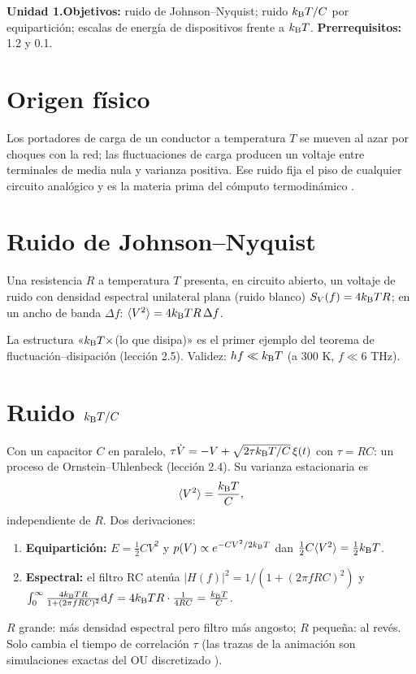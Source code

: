 \documentclass[11pt,a4paper]{article}
\begin{document}

\noindent\textbf{Unidad 1.}\quad\textbf{Objetivos:} ruido de Johnson--Nyquist; ruido $k_{\mathrm B} T/C$ por equipartición;
escalas de energía de dispositivos frente a $k_{\mathrm B} T$. \textbf{Prerrequisitos:} 1.2 y 0.1.

\section{Origen físico}
Los portadores de carga de un conductor a temperatura $T$ se mueven al azar por choques con la red; las
fluctuaciones de carga producen un voltaje entre terminales de media nula y varianza positiva. Ese ruido fija el
piso de cualquier circuito analógico y es la materia prima del cómputo termodinámico \cite{conte,melanson}.

\section{Ruido de Johnson--Nyquist}
\begin{resultado}
Una resistencia $R$ a temperatura $T$ presenta, en circuito abierto, un voltaje de ruido con densidad espectral
unilateral plana (ruido blanco) $S_V(f)=4k_{\mathrm B} TR$; en un ancho de banda $\Delta f$: $\langle V^2\rangle=4k_{\mathrm B} TR\,\Delta f$.
\end{resultado}
La estructura «$k_{\mathrm B} T\times$(lo que disipa)» es el primer ejemplo del teorema de fluctuación--disipación (lección 2.5).
Validez: $hf\ll k_{\mathrm B} T$ (a 300 K, $f\ll6$ THz).

\section{Ruido $k_{\mathrm B} T/C$}
Con un capacitor $C$ en paralelo, $\tau\dot V=-V+\sqrt{2\tau k_{\mathrm B} T/C}\,\xi(t)$ con $\tau=RC$: un proceso de
Ornstein--Uhlenbeck (lección 2.4). Su varianza estacionaria es
\begin{equation}\langle V^2\rangle=\frac{k_{\mathrm B} T}{C},\end{equation}
independiente de $R$. Dos derivaciones:
\begin{enumerate}[nosep]
\item \textbf{Equipartición:} $E=\frac12CV^2$ y $p(V)\propto e^{-CV^2/2k_{\mathrm B} T}$ dan $\frac12C\langle V^2\rangle=\frac12k_{\mathrm B} T$.
\item \textbf{Espectral:} el filtro RC atenúa $|H(f)|^2=1/(1+(2\pi fRC)^2)$ y
$\int_0^\infty\frac{4k_{\mathrm B} TR}{1+(2\pi fRC)^2}\mathrm{d} f=4k_{\mathrm B} TR\cdot\frac1{4RC}=\frac{k_{\mathrm B} T}C$.
\end{enumerate}
$R$ grande: más densidad espectral pero filtro más angosto; $R$ pequeña: al revés. Solo cambia el tiempo de correlación $\tau$
(las trazas de la animación son simulaciones exactas del OU discretizado \evS).
\end{document}
